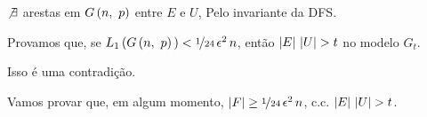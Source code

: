 \begin{fato}
  $\not\exists$ arestas em $G\left(n,\ p\vphantom{1j}\right)$ entre $E$ e $U$, Pelo invariante da DFS.
\end{fato}

Provamos que, se $L_1\left(G\left(n,\ p\vphantom{1j}\right)\vphantom{1j}\right)<\nicefrac{1}{24}\,\epsilon^2\,n$, então $\left|E\vphantom{1j}\right|\,\left|U\vphantom{1j}\right|>t$ no modelo $G_t$.

Isso é uma contradição.

Vamos provar que, em algum momento, $\left|F\vphantom{1j}\right|\geq\nicefrac{1}{24}\,\epsilon^2\,n$, c.c. $\left|E\vphantom{1j}\right|\,\left|U\vphantom{1j}\right|>t$.
